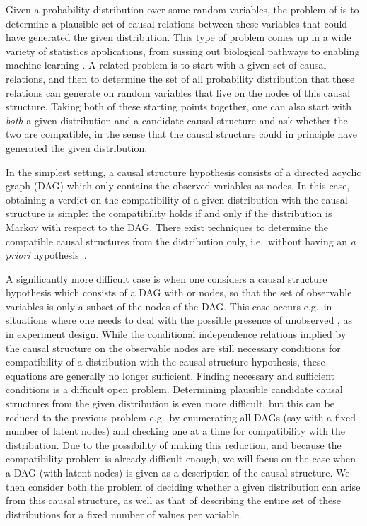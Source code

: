 Given a probability distribution over some random variables, the problem of  is to determine a plausible set of causal relations between these variables that could have generated the given distribution. This type of problem comes up in a wide variety of statistics applications, from sussing out biological pathways to enabling machine learning \cite{pearl2009causality,spirtes2011causation,studeny2005probabilistic,koller2009probabilistic}. A related problem is to start with a given set of causal relations, and then to determine the set of all probability distribution that these relations can generate on random variables that live on the nodes of this causal structure. Taking both of these starting points together, one can also start with \emph{both} a given distribution and a candidate causal structure and ask whether the two are compatible, in the sense that the causal structure could in principle have generated the given distribution.


In the simplest setting, a causal structure hypothesis consists of a directed acyclic graph (DAG) which only contains the observed variables as nodes. In this case, obtaining a verdict on the compatibility of a given distribution with the causal structure is simple: the compatibility holds if and only if the distribution is Markov with respect to the DAG. There exist techniques to determine the compatible causal structures from the distribution only, i.e.~without having an \emph{a priori} hypothesis~\cite{pearl2009causality}.

A significantly more difficult case is when one considers a causal structure hypothesis which consists of a DAG with  or  nodes, so that the set of observable variables is only a subset of the nodes of the DAG. This case occurs e.g.~in situations where one needs to deal with the possible presence of unobserved , as in experiment design. While the conditional independence relations implied by the causal structure on the observable nodes are still necessary conditions for compatibility of a distribution with the causal structure hypothesis, these equations are generally no longer sufficient. Finding necessary and sufficient conditions is a difficult open problem. Determining plausible candidate causal structures from the given distribution is even more difficult, but this can be reduced to the previous problem e.g.~by enumerating all DAGs (say with a fixed number of latent nodes) and checking one at a time for compatibility with the distribution. Due to the possibility of making this reduction, and because the compatibility problem is already difficult enough, we will focus on the case when a DAG (with latent nodes) is given as a description of the causal structure. We then consider both the problem of deciding whether a given distribution can arise from this causal structure, as well as that of describing the entire set of these distributions for a fixed number of values per variable.

